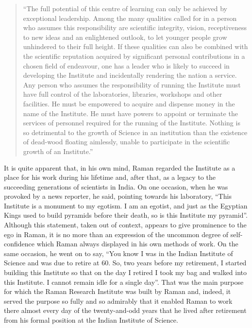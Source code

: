 \begin{quote}
{``The full potential of this centre of learning can only be
achieved by exceptional leadership. Among the many qualities
called for in a person who assumes this responsibility are scientific
integrity, vision, receptiveness to new ideas and an enlightened
outlook, to let younger people grow unhindered to their full
height. If these qualities can also be combined with the scientific
reputation acquired by significant personal contributions in a
chosen field of endeavour, one has a leader who is likely to succeed
in developing the Institute and incidentally rendering the nation
a service. Any person who assumes the responsibility of running
the Institute must have full control of the laboratories, libraries,
workshops and other facilities. He must be empowered to acquire
and dispense money in the name of the Institute. He must have
powers to appoint or terminate the services of personnel required
for the running of the Institute. Nothing is so detrimental to the
growth of Science in an institution than the existence of dead-wood floating aimlessly, unable to participate in the scientific
growth of an Institute.''}\relax
\end{quote}

It is quite apparent that, in his own mind, Raman regarded
the Institute as a place for his work during his lifetime and, after
that, as a legacy to the succeeding generations of scientists in
India. On one occasion, when he was provoked by a news
reporter, he said, pointing towards his laboratory, ``This Institute
is a monument to my egotism. I am an egotist, and just as
the Egyptian Kings used to build pyramids before their death,
so is this Institute my pyramid''. Although this statement, taken
out of context, appears to give prominence to the ego in Raman,
it is no more than an expression of the uncommon degree of self-confidence 
which Raman always displayed in his own methods
of work. On the same occasion, he went on to say, ``You know
I was in the Indian Institute of Science and was due to retire at
60. So, two years before my retirement, I started building this
Institute so that on the day I retired I took my bag and walked
into this Institute. I cannot remain idle for a single day''. That was
the main purpose for which the Raman Research Institute was
built by Raman and, indeed, it served the purpose so fully and
so admirably that it enabled Raman to work there almost every
day of the twenty-and-odd years that he lived after retirement
from his formal position at the Indian Institute of Science.

